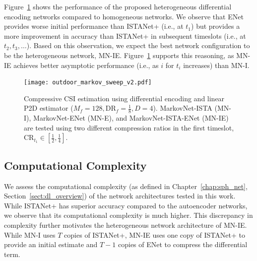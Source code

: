 Figure~\ref{fig:markov-p2d-results} shows the performance of the proposed heterogeneous differential encoding networks compared to homogeneous networks. We observe that ENet provides worse initial performance than ISTANet+ (i.e., at $t_1$) but provides a more improvement in accuracy than ISTANet+ in subsequent timeslots (i.e., at $t_2, t_3, \dots$). Based on this observation, we expect the best network configuration to be the heterogeneous network, MN-IE. Figure~\ref{fig:markov-p2d-results} supports this reasoning, as MN-IE achieves better asymptotic performance (i.e., as $i$ for $t_i$ increases) than MN-I.

\begin{figure}[!hbtp]
    \centering
    \texttt{[image: outdoor\_markov\_sweep\_v2.pdf]}
    \caption{Compressive CSI estimation using differential encoding and  linear P2D estimator ($M_f=128, \text{DR}_f=\frac{1}{8}, D=4$). MarkovNet-ISTA (MN-I), MarkovNet-ENet (MN-E), and MarkovNet-ISTA-ENet (MN-IE) are tested using two different compression ratios in the first timeslot, $\text{CR}_{t_1}\in\left[\frac{1}{2},\frac{1}{4}\right]$.}
    \label{fig:markov-p2d-results}
\end{figure}

\subsection{Computational Complexity}

We assess the computational complexity (as defined in Chapter~\ref{chap:sph_net}, Section~\ref{sect:dl_overview}) of the network architectures tested in this work. While ISTANet+ has superior accuracy compared to the autoencoder networks, we observe that its computational complexity is much higher. This discrepancy in complexity further motivates the heterogeneous network architecture of MN-IE. While MN-I uses $T$ copies of ISTANet+, MN-IE uses one copy of ISTANet+ to provide an initial estimate and $T-1$ copies of ENet to compress the differential term.

